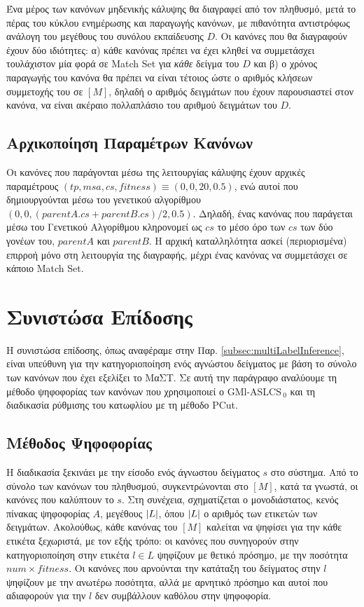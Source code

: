 Ένα μέρος των κανόνων μηδενικής κάλυψης θα διαγραφεί από τον πληθυσμό, μετά το πέρας του κύκλου ενημέρωσης και παραγωγής κανόνων, με πιθανότητα αντιστρόφως ανάλογη του μεγέθους του συνόλου εκπαίδευσης $D$. Οι κανόνες που θα διαγραφούν έχουν δύο ιδιότητες: α) κάθε κανόνας πρέπει να έχει κληθεί να συμμετάσχει τουλάχιστον μία φορά σε Match Set για \emph{κάθε} δείγμα του $D$ και β) ο χρόνος παραγωγής του κανόνα θα πρέπει να είναι τέτοιος ώστε ο αριθμός κλήσεων συμμετοχής του σε $[M]$, δηλαδή ο αριθμός δειγμάτων που έχουν παρουσιαστεί στον κανόνα, να είναι ακέραιο πολλαπλάσιο του αριθμού δειγμάτων του $D$.


\subsection{Αρχικοποίηση Παραμέτρων Κανόνων}
Οι κανόνες που παράγονται μέσω της λειτουργίας κάλυψης έχουν αρχικές παραμέτρους $(tp, msa, cs, fitness) \equiv (0,0,20,0.5)$, ενώ αυτοί που δημιουργούνται μέσω του γενετικού αλγορίθμου $(0,0,(parentA.cs+parentB.cs)/2, 0.5)$. Δηλαδή, ένας κανόνας που παράγεται μέσω του Γενετικού Αλγορίθμου κληρονομεί ως $cs$ το μέσο όρο των $cs$ των δύο γονέων του, $parentA$ και $parentB$. Η αρχική καταλληλότητα ασκεί (περιορισμένα) επιρροή μόνο στη λειτουργία της διαγραφής, μέχρι ένας κανόνας να συμμετάσχει σε κάποιο Match Set. 



\section{Συνιστώσα Επίδοσης}
\label{sec:multiLabelInference}
Η συνιστώσα επίδοσης, όπως αναφέραμε στην Παρ. \ref{subsec:multiLabelInference}, είναι υπεύθυνη για την κατηγοριοποίηση ενός αγνώστου δείγματος με βάση το σύνολο των κανόνων που έχει εξελίξει το ΜαΣΤ. Σε αυτή την παράγραφο αναλύουμε τη μέθοδο ψηφοφορίας των κανόνων που χρησιμοποιεί ο GMl-ASLCS$_{\:0}$ και τη διαδικασία ρύθμισης του κατωφλίου με τη μέθοδο PCut.

\subsection{Μέθοδος Ψηφοφορίας}
\label{subsec:multiLabelVoting}
Η διαδικασία ξεκινάει με την είσοδο ενός άγνωστου δείγματος $s$ στο σύστημα. Από το σύνολο των κανόνων του πληθυσμού, συγκεντρώνονται στο $[M]$, κατά τα γνωστά, οι κανόνες που καλύπτουν το $s$. Στη συνέχεια, σχηματίζεται ο μονοδιάστατος, κενός πίνακας ψηφοφορίας $A$, μεγέθους $\lvert L\rvert$, όπου $\lvert L\rvert$ ο αριθμός των ετικετών των δειγμάτων. Ακολούθως, κάθε κανόνας του $[M]$ καλείται να ψηφίσει για την κάθε ετικέτα ξεχωριστά, με τον εξής τρόπο: οι κανόνες που συνηγορούν στην κατηγοριοποίηση στην ετικέτα $l \in L$ ψηφίζουν με θετικό πρόσημο, με την ποσότητα $num \times fitness$. Οι κανόνες που αρνούνται την κατάταξη του δείγματος στην $l$ ψηφίζουν με την ανωτέρω ποσότητα, αλλά με αρνητικό πρόσημο και αυτοί που αδιαφορούν για την $l$ δεν συμβάλλουν καθόλου στην ψηφοφορία. 

